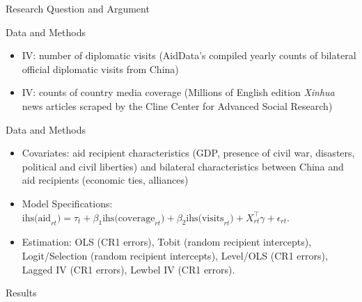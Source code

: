 \documentclass{beamer}
\begin{document}
\begin{frame}{Research Question and Argument}
\begin{frame}{Data and Methods}
\begin{itemize}
\item IV: number of diplomatic visits (AidData’s compiled yearly counts of bilateral official
diplomatic visits from China)

\item IV: counts of country media coverage (Millions of English edition \textit{Xinhua} news articles scraped by the Cline Center for Advanced Social Research)


\end{itemize}

\end{frame}


\begin{frame}{Data and Methods}

\begin{itemize} 

\item Covariates: aid recipient characteristics (GDP, presence of civil war, disasters, political and civil liberties) and bilateral characteristics between China and aid recipients (economic ties, alliances)

\item Model Specifications: $\text{ihs(aid}_{rt}) = \tau_t + \beta_1\text{ihs(coverage}_{rt}) + \beta_2\text{ihs(visits}_{rt}) + X_{rt}^\top \gamma + \epsilon_{rt}.$

\item Estimation: OLS (CR1 errors), Tobit (random recipient intercepts), Logit/Selection (random recipient intercepts), Level/OLS (CR1 errors), Lagged IV (CR1 errors), Lewbel IV (CR1 errors).

\end{itemize}

\end{frame}


\begin{frame}{Results}

\begin{table}


\end{table}
\end{frame}
\end{frame}
\end{document}
